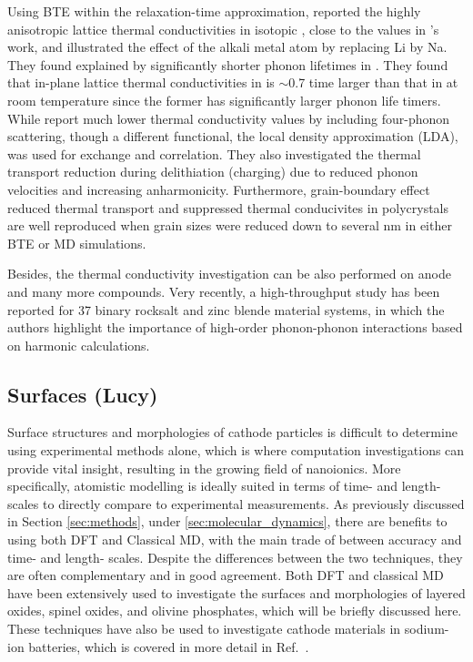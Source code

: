 \documentclass[../main.tex]{subfiles}
\begin{document}
Using BTE within the relaxation-time approximation, \citeauthor{mattila2020lattice} reported the highly anisotropic lattice thermal conductivities in isotopic , close to the values in \citeauthor{yang2019highly}'s work\cite{yang2019highly,yang2020chemical}, and illustrated the effect of the alkali metal atom by replacing Li by Na.\cite{mattila2020lattice} They found explained by significantly shorter phonon lifetimes in . They found that in-plane lattice thermal conductivities in  is $\sim$0.7 time larger than that in  at room temperature since the former has significantly larger phonon life timers. 
While \citeauthor{feng2020quantum} report much lower thermal conductivity values by including four-phonon scattering, though a different functional, the local density approximation (LDA), was used for exchange and correlation.\cite{feng2020quantum} They also investigated the thermal transport reduction during delithiation (charging) due to reduced phonon velocities and increasing anharmonicity.
Furthermore, grain-boundary effect reduced thermal transport and  suppressed thermal conducivites in polycrystals are well reproduced when grain sizes were reduced down to several nm in either BTE or MD simulations. \cite{he2019thermal}

Besides, the thermal conductivity investigation can be also performed on anode and many more compounds.\cite{qian2016anisotropic, wei2018tunable} Very recently, a high-throughput study has been reported for 37 binary rocksalt and zinc blende material systems, in which the authors highlight the importance of high-order phonon-phonon interactions based on harmonic calculations. \cite{xia2020high}

\subsection{Surfaces (Lucy)}
Surface structures and morphologies of cathode particles is difficult to determine using experimental methods alone, which is where computation investigations can provide vital insight, resulting in the growing field of nanoionics. \cite{zhang2013nanomaterials} More specifically, atomistic modelling is ideally suited in terms of time- and length- scales to directly compare to experimental measurements. \cite{catlow2010modelling} As previously discussed in Section \ref{sec:methods}, under \ref{sec:molecular_dynamics}, there are benefits to using both DFT and Classical MD, with the main trade of between accuracy and time- and length- scales. Despite the differences between the two techniques, they are often complementary and in good agreement. Both DFT and classical MD have been extensively used to investigate the surfaces and morphologies of layered oxides, spinel oxides, and olivine phosphates, which will be briefly discussed here. These techniques have also be used to investigate cathode materials in sodium-ion batteries, which is covered in more detail in Ref.~.
\end{document}
